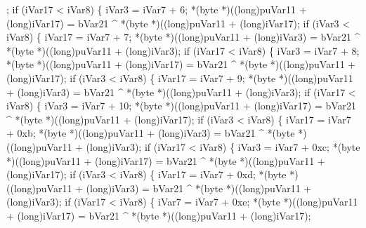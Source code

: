 \documentclass[
]{article}
\newenvironment{Shaded}{}{}
\newcommand{\NormalTok}[1]{#1}
\begin{document}
\begin{Shaded}
\begin{Highlighting}[]
\NormalTok{            ;}
\NormalTok{            if (iVar17 \textless{} iVar8) \{}
\NormalTok{              iVar3 = iVar7 + 6;}
\NormalTok{              *(byte *)((long)puVar11 + (long)iVar17) =}
\NormalTok{                   bVar21 \^{} *(byte *)((long)puVar11 + (long)iVar17);}
\NormalTok{              if (iVar3 \textless{} iVar8) \{}
\NormalTok{                iVar17 = iVar7 + 7;}
\NormalTok{                *(byte *)((long)puVar11 + (long)iVar3) =}
\NormalTok{                     bVar21 \^{} *(byte *)((long)puVar11 + (long)iVar3);}
\NormalTok{                if (iVar17 \textless{} iVar8) \{}
\NormalTok{                  iVar3 = iVar7 + 8;}
\NormalTok{                  *(byte *)((long)puVar11 + (long)iVar17) =}
\NormalTok{                       bVar21 \^{} *(byte *)((long)puVar11 + (long)iVar17);}
\NormalTok{                  if (iVar3 \textless{} iVar8) \{}
\NormalTok{                    iVar17 = iVar7 + 9;}
\NormalTok{                    *(byte *)((long)puVar11 + (long)iVar3) =}
\NormalTok{                         bVar21 \^{} *(byte *)((long)puVar11 + (long)iVar3);}
\NormalTok{                    if (iVar17 \textless{} iVar8) \{}
\NormalTok{                      iVar3 = iVar7 + 10;}
\NormalTok{                      *(byte *)((long)puVar11 + (long)iVar17) =}
\NormalTok{                           bVar21 \^{} *(byte *)((long)puVar11 + (long)iVar17);}
\NormalTok{                      if (iVar3 \textless{} iVar8) \{}
\NormalTok{                        iVar17 = iVar7 + 0xb;}
\NormalTok{                        *(byte *)((long)puVar11 + (long)iVar3) =}
\NormalTok{                             bVar21 \^{} *(byte *)((long)puVar11 + (long)iVar3);}
\NormalTok{                        if (iVar17 \textless{} iVar8) \{}
\NormalTok{                          iVar3 = iVar7 + 0xc;}
\NormalTok{                          *(byte *)((long)puVar11 + (long)iVar17) =}
\NormalTok{                               bVar21 \^{} *(byte *)((long)puVar11 + (long)iVar17);}
\NormalTok{                          if (iVar3 \textless{} iVar8) \{}
\NormalTok{                            iVar17 = iVar7 + 0xd;}
\NormalTok{                            *(byte *)((long)puVar11 + (long)iVar3) =}
\NormalTok{                                 bVar21 \^{} *(byte *)((long)puVar11 + (long)iVar3);}
\NormalTok{                            if (iVar17 \textless{} iVar8) \{}
\NormalTok{                              iVar7 = iVar7 + 0xe;}
\NormalTok{                              *(byte *)((long)puVar11 + (long)iVar17) =}
\NormalTok{                                   bVar21 \^{} *(byte *)((long)puVar11 + (long)iVar17);}

\end{Highlighting}
\end{Shaded}
\end{document}
